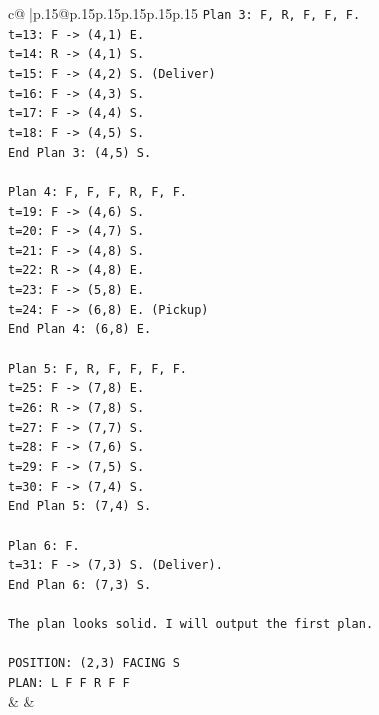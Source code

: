 \documentclass{article}
\begin{document}
{\begin{supertabular}{c@{$\;$}|p{.15\linewidth}@{}p{.15\linewidth}p{.15\linewidth}p{.15\linewidth}p{.15\linewidth}p{.15\linewidth}}
{{{\texttt{Plan 3: F, R, F, F, F.} \\
\texttt{t=13: F {-}> (4,1) E.} \\
\texttt{t=14: R {-}> (4,1) S.} \\
\texttt{t=15: F {-}> (4,2) S. (Deliver)} \\
\texttt{t=16: F {-}> (4,3) S.} \\
\texttt{t=17: F {-}> (4,4) S.} \\
\texttt{t=18: F {-}> (4,5) S.} \\
\texttt{End Plan 3: (4,5) S.} \\
\\ 
\texttt{Plan 4: F, F, F, R, F, F.} \\
\texttt{t=19: F {-}> (4,6) S.} \\
\texttt{t=20: F {-}> (4,7) S.} \\
\texttt{t=21: F {-}> (4,8) S.} \\
\texttt{t=22: R {-}> (4,8) E.} \\
\texttt{t=23: F {-}> (5,8) E.} \\
\texttt{t=24: F {-}> (6,8) E. (Pickup)} \\
\texttt{End Plan 4: (6,8) E.} \\
\\ 
\texttt{Plan 5: F, R, F, F, F, F.} \\
\texttt{t=25: F {-}> (7,8) E.} \\
\texttt{t=26: R {-}> (7,8) S.} \\
\texttt{t=27: F {-}> (7,7) S.} \\
\texttt{t=28: F {-}> (7,6) S.} \\
\texttt{t=29: F {-}> (7,5) S.} \\
\texttt{t=30: F {-}> (7,4) S.} \\
\texttt{End Plan 5: (7,4) S.} \\
\\ 
\texttt{Plan 6: F.} \\
\texttt{t=31: F {-}> (7,3) S. (Deliver).} \\
\texttt{End Plan 6: (7,3) S.} \\
\\ 
\texttt{The plan looks solid. I will output the first plan.} \\
\\ 
\texttt{POSITION: (2,3) FACING S} \\
\texttt{PLAN: L F F R F F} \\
            }
        }
    }
    & & \\ \\


\end{supertabular}}
\end{document}
